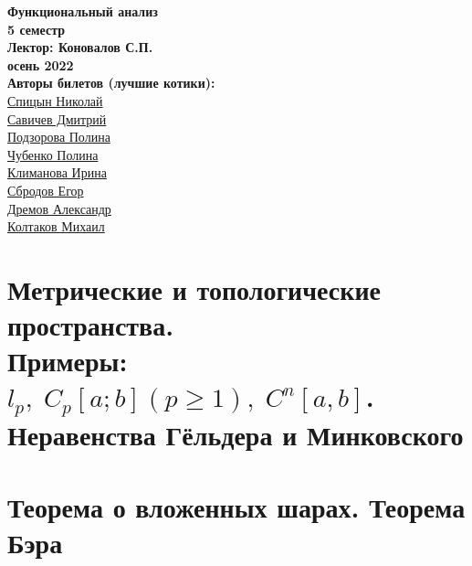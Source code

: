 


    \thispagestyle{empty}
    \BgThispage
    \begin{center}
        \vspace*{4cm}
        
        \Huge
        \textbf{Функциональный анализ} \\
        \textbf{5 семестр} \\
        \textbf{Лектор: Коновалов С.П.} \\
        \textbf{осень 2022} \\
        
        \vspace{7cm}
        \Large
        \textbf{Авторы билетов (лучшие котики):} \\
        \href{https://vk.com/spitsynn}{Спицын Николай} \\
        \href{https://vk.com/dimasav123}{Савичев Дмитрий} \\
        \href{https://vk.com/id165779384}{Подзорова Полина} \\
        \href{https://vk.com/poli.dobro}{Чубенко Полина} \\        
        \href{https://vk.com/meraklim}{Климанова Ирина} \\
        \href{https://vk.com/ulegor}{Сбродов Егор} \\
        \href{https://vk.com/aldrmv}{Дремов Александр} \\
        \href{https://vk.com/id153425653}{Колтаков Михаил} \\
        
    \end{center}

\newpage

\tableofcontents
\newpage


\section{Метрические и топологические пространства.\\ Примеры: $l_p,\;C_p[a; b](p \geqslant 1),\;C^n[a, b]$. Неравенства Гёльдера и Минковского}


\section{Теорема о вложенных шарах. Теорема Бэра}


